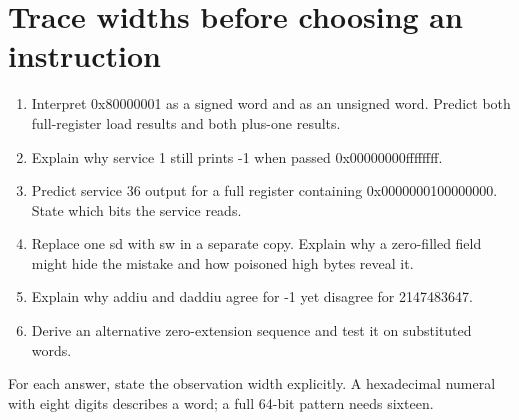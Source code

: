 \section{Trace widths before choosing an
  instruction}\label{004-bit-inspector-x-practice-trace-widths-before-choosing-an-instruction}

\begin{enumerate}
  \def\labelenumi{\arabic{enumi}.}
  \tightlist
  \item
        Interpret 0x80000001 as a signed word and as an unsigned word. Predict
        both full-register load results and both plus-one results.
  \item
        Explain why service 1 still prints -1 when passed 0x00000000ffffffff.
  \item
        Predict service 36 output for a full register containing
        0x0000000100000000. State which bits the service reads.
  \item
        Replace one sd with sw in a separate copy. Explain why a zero-filled
        field might hide the mistake and how poisoned high bytes reveal it.
  \item
        Explain why addiu and daddiu agree for -1 yet disagree for 2147483647.
  \item
        Derive an alternative zero-extension sequence and test it on
        substituted words.
\end{enumerate}

For each answer, state the observation width explicitly. A hexadecimal
numeral with eight digits describes a word; a full 64-bit pattern needs
sixteen.
